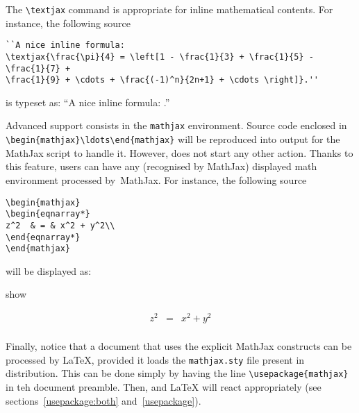 The \verb+\textjax+ command is appropriate for inline mathematical contents.
For instance, the following source
\begin{verbatim}
``A nice inline formula:
\textjax{\frac{\pi}{4} = \left[1 - \frac{1}{3} + \frac{1}{5} - \frac{1}{7} +
\frac{1}{9} + \cdots + \frac{(-1)^n}{2n+1} + \cdots \right]}.''
\end{verbatim}
is typeset as: ``A nice inline formula: .''

%
%
Advanced support consists in the \texttt{mathjax} environment. Source code
enclosed in \verb+\begin{mathjax}\ldots\end{mathjax}+ will be
reproduced into output for the \textsf{MathJax} script to handle it.
However, \hevea{} does not start any other action.
Thanks to this feature, users can have any (recognised by \textsf{MathJax})
displayed math environment processed by~\textsf{MathJax}. For instance,
the following source
\begin{verbatim}
\begin{mathjax}
\begin{eqnarray*}
z^2  & = & x^2 + y^2\\
\end{eqnarray*}
\end{mathjax}
\end{verbatim}
will be displayed as:
\begin{divstyle}{show}
\begin{mathjax}
\begin{eqnarray*}
z^2  & = & x^2 + y^2\\
\end{eqnarray*}
\end{mathjax}
\end{divstyle}

\iffalse
\newenvironment{greenjax}
{\divstyle{verbatim}\@print{\[}\mathjax}
{\endmathjax\@print{\]}\enddivstyle}

\begin{greenjax}
\frac{\pi}{4} = \sum_{n=0}^{\infty} \frac{(-1)^n}{2n+1}
\end{greenjax}
\fi

Finally, notice that a document that uses the explicit \textsf{MathJax}
constructs can be processed by \LaTeX, provided
it loads the \texttt{mathjax.sty} file present in \hevea{} distribution.
This can be done simply by having the line \verb+\usepackage{mathjax}+ in
teh document preamble. Then, \hevea{} and \LaTeX{} will react appropriately
(see sections~\ref{usepackage:both} and~\ref{usepackage}).

